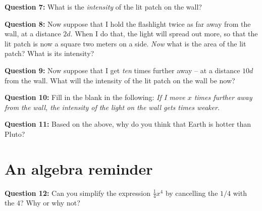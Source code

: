 \documentclass[11pt]{article}
\begin{document}
\vspace{1in}
{\bf Question 7:} What is the {\it intensity} of the lit patch on the wall?

\vspace{1in}
{\bf Question 8:} Now suppose that I hold the flashlight twice as far away from the wall, at a distance $2d$. When I do that,
the light will spread out more, so that the lit patch is now a square two meters on a side. {\it Now} what is the area 
of the lit patch? What is its intensity?

\vspace{1in}
{\bf Question 9:} Now suppose that I get {\it ten} times further away -- at a distance $10d$ from the wall. What will the
intensity of the lit patch on the wall be now? 

\vspace{1in}
{\bf Question 10:} Fill in the blank in the following: {\it If I move $x$ times further away from the wall, the 
intensity of the light on the wall gets \underline{\hspace{1in}} times weaker}. 

\vspace{1in}
{\bf Question 11:} Based on the above, why do you think that Earth is hotter than Pluto?

\vspace{1in}
\section{An algebra reminder}

{\bf Question 12:} Can you simplify the expression $\frac{1}{4} x^4$ by cancelling the $1/4$ with the $4$? Why or why not?
\end{document}
